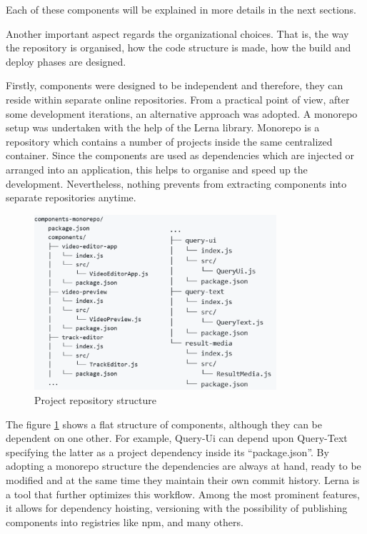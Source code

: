 Each of these components will be explained in more details in the next sections. 

Another important aspect regards the organizational choices. That is, the way the repository is organised, how the code structure is made, how the build and deploy phases are designed.

Firstly, components were designed to be independent and therefore, they can reside within separate online repositories. From a practical point of view, after some development iterations, an alternative approach was adopted. A monorepo setup was undertaken with the help of the Lerna library. Monorepo is a repository which contains a number of projects inside the same centralized container. Since the components are used as dependencies which are injected or arranged into an application, this helps to organise and speed up the development. Nevertheless, nothing prevents from extracting components into separate repositories anytime.

\begin{figure}[H]
\centering
\includegraphics[width=0.8\textwidth]{images/repository.png}
\caption{Project repository structure}
\label{fig:repoStructure}
\end{figure}

The figure \ref{fig:repoStructure} shows a flat structure of components, although they can be dependent on one other. For example, Query-Ui can depend upon Query-Text specifying the latter as a project dependency inside its “package.json”. By adopting a monorepo structure the dependencies are always at hand, ready to be modified and at the same time they maintain their own commit history. Lerna is a tool that further optimizes this workflow. Among the most prominent features, it allows for dependency hoisting, versioning with the possibility of publishing components into registries like npm, and many others.

